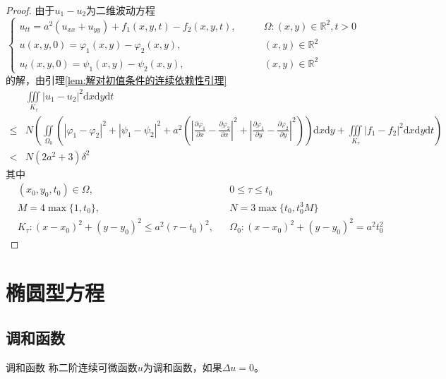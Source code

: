 \documentclass[lang = cn, scheme = chinese, thmcnt = section]{elegantbook}
\newcommand{\R}{\mathbb{R}}            %
\newcommand{\dd}{\mathrm{d}}           %
\newcommand{\IInt}{\iint\limits}
\newcommand{\IIInt}{\iiint\limits}
\begin{document}
\begin{proof}
	由于$u_1-u_2$为二维波动方程
	$$
	\begin{cases}
		u_{tt}=a^2(u_{xx}+u_{yy})+f_1(x,y,t)-f_2(x,y,t),\qquad & \Omega:(x,y)\in \R^2,t>0\\
		u(x,y,0)=\varphi_1(x,y)-\varphi_2(x,y),\qquad & (x,y)\in \R^2\\
		u_t(x,y,0)=\psi_1(x,y)-\psi_2(x,y),\qquad & (x,y)\in \R^2
	\end{cases}
	$$
	的解，由引理\ref{lem:解对初值条件的连续依赖性引理}
	\begin{align*}
		& \IIInt_{K_\tau}|u_1-u_2|^2\dd x\dd y\dd t\\
		\le & 
		N\left( 
		\IInt_{\Omega_0}\left(|\varphi_1-\varphi_2|^2+|\psi_1-\psi_2|^2+a^2\left(\left|\frac{\partial \varphi_1}{\partial x}-\frac{\partial \varphi_2}{\partial x}\right|^2+\left|\frac{\partial \varphi_1}{\partial y}-\frac{\partial \varphi_2}{\partial y}\right|^2\right)\right)\dd x\dd y+\IIInt_{K_\tau}|f_1-f_2|^2\dd x\dd y\dd t
		\right)\\
		< & N(2a^2+3)\delta^2
	\end{align*}
	其中
	\begin{align*}
		& (x_0,y_0,t_0)\in\Omega,&&
		0\le \tau \le t_0\\
		& M=4\max\{ 1,t_0 \},&&
		N= 3\max\{ t_0,t_0^3M \}\\
		& K_\tau:(x-x_0)^2+(y-y_0)^2\le a^2(\tau-t_0)^2,&&
		\Omega_0:(x-x_0)^2+(y-y_0)^2= a^2t_0^2
	\end{align*}
\end{proof}

\chapter{椭圆型方程}

\section{调和函数}

\begin{definition}{调和函数}
	称二阶连续可微函数$u$为调和函数，如果$\Delta u=0$。
\end{definition}
\end{document}
